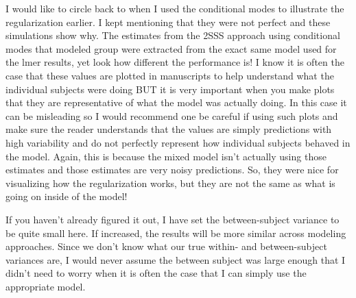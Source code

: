 \documentclass[
]{book}
\begin{document}
I would like to circle back to when I used the conditional modes to illustrate the regularization earlier. I kept mentioning that they were not perfect and these simulations show why. The estimates from the 2SSS approach using conditional modes that modeled group were extracted from the exact same model used for the lmer results, yet look how different the performance is! I know it is often the case that these values are plotted in manuscripts to help understand what the individual subjects were doing BUT it is very important when you make plots that they are representative of what the model was actually doing. In this case it can be misleading so I would recommend one be careful if using such plots and make sure the reader understands that the values are simply predictions with high variability and do not perfectly represent how individual subjects behaved in the model. Again, this is because the mixed model isn't actually using those estimates and those estimates are very noisy predictions. So, they were nice for visualizing how the regularization works, but they are not the same as what is going on inside of the model!

If you haven't already figured it out, I have set the between-subject variance to be quite small here. If increased, the results will be more similar across modeling approaches. Since we don't know what our true within- and between-subject variances are, I would never assume the between subject was large enough that I didn't need to worry when it is often the case that I can simply use the appropriate model.
\end{document}
